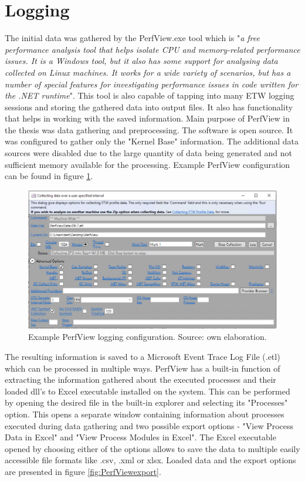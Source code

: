 \documentclass[a4paper,twoside,12pt]{book}
\begin{document}
\section{Logging}

The initial data was gathered by the PerfView.exe tool which is "\textit{a free performance analysis 
tool that helps isolate CPU and memory-related performance issues. It is a Windows tool, 
but it also has some support for analysing data collected on Linux machines. It works for 
a wide variety of scenarios, but has a number of special features for investigating 
performance issues in code written for the .NET runtime}"\cite{bib:PerfView}. This tool is also capable of 
tapping into many ETW logging sessions and storing the gathered data into output files. It also 
has functionality that helps in working with the saved information. Main purpose of PerfView 
in the thesis was data gathering and preprocessing. The software is open source.
It was configured to gather only the "Kernel Base" information. The additional data sources 
were disabled due to the large quantity of data being generated and not sufficient memory 
available for the processing. Example PerfView configuration can be found in figure 
\ref{fig:PerfViewConfig}. 

\begin{figure}
	\centering
	\includegraphics[scale=0.55]{images/perf_config}
	\caption{Example PerfView logging configuration. Source: own elaboration.}
	\label{fig:PerfViewConfig}
 \end{figure}

The resulting information is saved to a Microsoft Event Trace Log File (.etl) which can be 
processed in multiple ways. PerfView has a built-in function of extracting the information 
gathered about the executed processes and their loaded dll's to Excel executable installed 
on the system. This can be performed by opening the desired file in the built-in explorer 
and selecting its "Processes" option. This opens a separate window containing information 
about processes executed during data gathering and two possible export options - 
"View Process Data in Excel" and "View Process Modules in Excel". The Excel executable 
opened by choosing either of the options allows to save the data to multiple easily 
accessible file formats like .csv, .xml or xlsx. Loaded data and the export options are 
presented in figure \ref{fig:PerfViewexport}.
\end{document}
